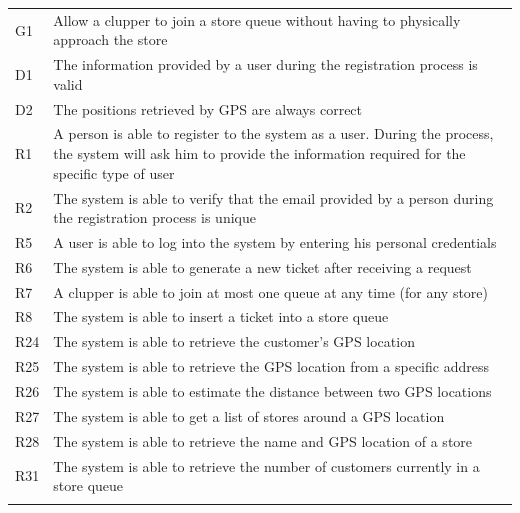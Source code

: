 \documentclass[
]{article}
\begin{document}
\begin{longtable}[]{@{}
  >{\raggedright\arraybackslash}p{}
  >{\raggedright\arraybackslash}p{}@{}}
\toprule
G1 & Allow a clupper to join a store queue without having to physically
approach the store \\ \addlinespace
\midrule
\endhead
D1 & The information provided by a user during the registration process
is valid \\ \addlinespace
D2 & The positions retrieved by GPS are always correct \\ \addlinespace
R1 & A person is able to register to the system as a user. During the
process, the system will ask him to provide the information required for
the specific type of user \\ \addlinespace
R2 & The system is able to verify that the email provided by a person
during the registration process is unique \\ \addlinespace
R5 & A user is able to log into the system by entering his personal
credentials \\ \addlinespace
R6 & The system is able to generate a new ticket after receiving a
request \\ \addlinespace
R7 & A clupper is able to join at most one queue at any time (for any
store) \\ \addlinespace
R8 & The system is able to insert a ticket into a store
queue \\ \addlinespace
R24 & The system is able to retrieve the customer's GPS
location \\ \addlinespace
R25 & The system is able to retrieve the GPS location from a specific
address \\ \addlinespace
R26 & The system is able to estimate the distance between two GPS
locations \\ \addlinespace
R27 & The system is able to get a list of stores around a GPS
location \\ \addlinespace
R28 & The system is able to retrieve the name and GPS location of a
store \\ \addlinespace
R31 & The system is able to retrieve the number of customers currently
in a store queue \\ \addlinespace
\bottomrule
\end{longtable}
\end{document}
